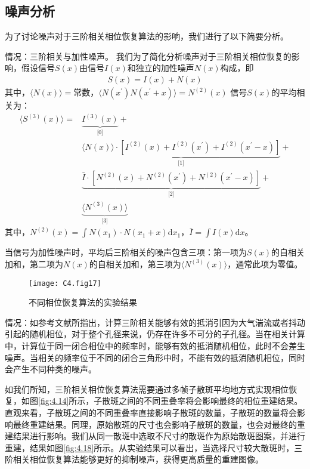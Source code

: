 \subsection{噪声分析}
为了讨论噪声对于三阶相关相位恢复算法的影响，我们进行了以下简要分析。

情况：三阶相关与加性噪声。
我们为了简化分析噪声对于三阶相关相位恢复的影响，假设信号$S(x)$由信号$I(x)$和独立的加性噪声$N(x)$构成，即
\begin{equation}
\begin{aligned}
S(x) = I(x)+N(x)
\end{aligned}
\label{eq:4.20}
\end{equation}其中，$\langle N(x) \rangle = \mbox{常数} $，$\langle N(x^{\prime})  N(x^{\prime} +x) \rangle = N^{(2)}(x) $
信号$S(x)$的平均相关为：
\begin{equation}
\begin{aligned}
\langle S^{(3)}(x) \rangle = & \underbrace{I^{(3)}(x)}_{\text{[0]}}+\\
& \underbrace{\langle N(x)\rangle \cdot \left[ I^{(2)}(x) +I^{(2)}(x^{\prime}) +I^{(2)}(x^{\prime}-x) \right] }_{\text{[1]}}+\\
& \underbrace{ \bar{I} \cdot \left[ N^{(2)}(x) +N^{(2)}(x^{\prime}) +N^{(2)}(x^{\prime}-x) \right]}_{\text{[2]}}+\\
& \underbrace{\langle N^{(3)}(x)\rangle}_{\text{[3]}}
\end{aligned}
\label{eq:4.21}
\end{equation}其中，$N^{(2)}(x) = \int N(x_1) \cdot N(x_1+x) \mathrm{d}{x_1}$，$\bar{I} = \int I(x)\mathrm{d}{x}$。

当信号为加性噪声时，平均后三阶相关的噪声包含三项：第一项为$S(x)$的自相关加和，第二项为$N(x)$的自相关加和，第三项为$\langle N^{(3)}(x)\rangle$，通常此项为零值。

\begin{figure}[htp]
	\centering
	\texttt{[image: C4.fig17]}
	\caption{不同相位恢复算法的实验结果}
	\label{fig:4.17}
\end{figure}

情况：如参考文献\cite{lohmann_speckle_1983,wu_single-shot_2016}所指出，计算三阶相关能够有效的抵消引因为大气湍流或者抖动引起的随机相位，对于整个孔径来说，仍存在许多不可分的子孔径。当在相关计算中，计算位于同一闭合相位中的频率时，能够有效的抵消随机相位，此时不会差生噪声。当相关的频率位于不同的闭合三角形中时，不能有效的抵消随机相位，同时会产生不同种类的噪声。

如我们所知，三阶相关相位恢复算法需要通过多帧子散斑平均地方式实现相位恢复，如图\ref{fig:4.14}所示，子散斑之间的不同重叠率将会影响最终的相位重建结果。直观来看，子散斑之间的不同重叠率直接影响子散斑的数量，子散斑的数量将会影响最终重建结果。同理，原始散斑的尺寸也会影响子散斑的数量，也会对最终的重建结果进行影响。我们从同一散斑中选取不尺寸的散斑作为原始散斑图案，并进行重建，结果如图\ref{fig:4.18}所示。从实验结果可以看出，当选择尺寸较大散斑时，三阶相关相位恢复算法能够更好的抑制噪声，获得更高质量的重建图像。

